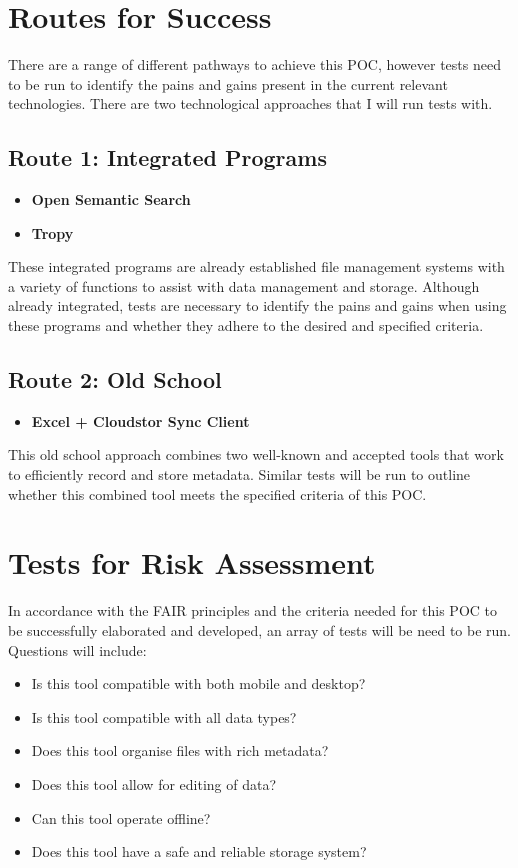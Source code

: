 \documentclass{article}
\begin{document}
\section{Routes for Success}
There are a range of different pathways to achieve this POC, however tests need to be run to identify the pains and gains present in the current relevant technologies. There are two technological approaches that I will run tests with. 
\subsection{Route 1: Integrated Programs}

\begin{itemize}
\item \textbf{Open Semantic Search}
\item \textbf{Tropy}
\end{itemize}
These integrated programs are already established file management systems with a variety of functions to assist with data management and storage. Although already integrated, tests are necessary to identify the pains and gains when using these programs and whether they adhere to the desired and specified criteria.

\subsection{Route 2: Old School}
\begin{itemize}
\item \textbf{Excel + Cloudstor Sync Client}
\end{itemize}
This old school approach combines two well-known and accepted tools that work to efficiently record and store metadata. Similar tests will be run to outline whether this combined tool meets the specified criteria of this POC.

\section{Tests for Risk Assessment}
In accordance with the FAIR principles and the criteria needed for this POC to be successfully elaborated and developed, an array of tests will be need to be run. Questions will include:
\begin{itemize}
\item Is this tool compatible with both mobile and desktop?
\item Is this tool compatible with all data types?
\item Does this tool organise files with rich metadata?
\item Does this tool allow for editing of data?
\item Can this tool operate offline?
\item Does this tool have a safe and reliable storage system?
\end{itemize}
\end{document}

